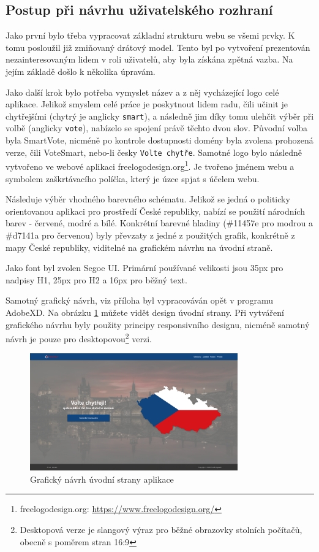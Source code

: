\subsection{Postup při návrhu uživatelského rozhraní}
Jako první bylo třeba vypracovat základní strukturu webu se všemi prvky. K tomu posloužil již zmiňovaný drátový model. Tento byl po vytvoření prezentován nezainteresovaným lidem v roli uživatelů, aby byla získána zpětná vazba. Na jejím základě došlo k několika úpravám.
\par Jako další krok bylo potřeba vymyslet název a z něj vycházející logo celé aplikace. Jelikož smyslem celé práce je poskytnout lidem radu, čili učinit je chytřejšími (chytrý je anglicky \texttt{smart}), a následně jim díky tomu ulehčit výběr při volbě (anglicky \texttt{vote}), nabízelo se spojení právě těchto dvou slov. Původní volba byla SmartVote, nicméně po kontrole dostupnosti domény byla zvolena prohozená verze, čili VoteSmart, nebo-li česky \texttt{Volte chytře}. Samotné logo bylo následně vytvořeno ve webové aplikaci freelogodesign.org\footnote{freelogodesign.org: \url{https://www.freelogodesign.org/}}. Je tvořeno jménem webu a symbolem zaškrtávacího políčka, který je úzce spjat s účelem webu.
\par Následuje výběr vhodného barevného schématu. Jelikož se jedná o politicky orientovanou aplikaci pro prostředí České republiky, nabízí se použití národních barev - červené, modré a bílé. Konkrétní barevné hladiny (\#11457e pro modrou a \#d7141a pro červenou) byly převzaty z jedné z použitých grafik, konkrétně z mapy České republiky\cite{grafika-mapa}, viditelné na grafickém návrhu na úvodní straně. 
\par Jako font byl zvolen Segoe UI. Primární používané velikosti jsou 35px pro nadpisy H1, 25px pro H2 a 16px pro běžný text.
\par Samotný grafický návrh, viz příloha  byl vypracováván opět v programu AdobeXD. Na obrázku \ref{fig:graphic-homepage} můžete vidět design úvodní strany. Při vytváření grafického návrhu byly použity principy responsivního designu, nicméně samotný návrh je pouze pro desktopovou\footnote{Desktopová verze je slangový výraz pro běžné obrazovky stolních počítačů, obecně s poměrem stran 16:9} verzi. 


\begin{figure}
    \centering
    \includegraphics[width=0.8\textwidth]{obrazky-figures/Homepage.pdf}
    \caption{Grafický návrh úvodní strany aplikace}
    \label{fig:graphic-homepage}
\end{figure}

